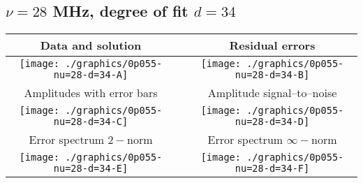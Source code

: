 

% 

\clearpage{}
\break{}

\subsection{$\nu = 28$ MHz, degree of fit $d = 34$}

\begin{table}[h]
    \begin{center}
        \begin{tabular}{ccc}
            Data and solution & \quad & Residual errors \\\hline
            \texttt{[image: ./graphics/0p055-nu=28-d=34-A]} &&
            \texttt{[image: ./graphics/0p055-nu=28-d=34-B]} \\[15pt]
            Amplitudes with error bars && Amplitude signal--to--noise \\\hline
            \texttt{[image: ./graphics/0p055-nu=28-d=34-C]} &&
            \texttt{[image: ./graphics/0p055-nu=28-d=34-D]} \\[15pt]
            Error spectrum $2-$norm && Error spectrum $\infty-$norm \\\hline
            \texttt{[image: ./graphics/0p055-nu=28-d=34-E]} &&
            \texttt{[image: ./graphics/0p055-nu=28-d=34-F]} \\[15pt]
        \end{tabular}
    \end{center}
\label{fig:elev=55, nu=28}
\end{table}



\endinput
